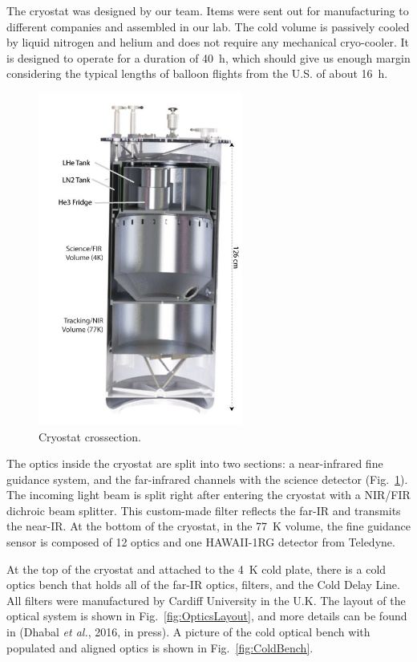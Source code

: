 The cryostat was designed by our team. Items were sent out for manufacturing to different companies and assembled in our lab. The cold volume is passively cooled by liquid nitrogen and helium and does not require any mechanical cryo-cooler. It is designed to operate for a duration of \SI{40}{\hour}, which should give us enough margin considering the typical lengths of balloon flights from the U.S. of about \SI{16}{\hour}. 

\begin{figure}[!h]
		\centering
		\includegraphics[width=0.6\textwidth]{Figures/Dewar.jpg} 
		\caption[Cryostat crossection]{Cryostat crossection.}
		\label{fig:CryostatCrosssection}
\end{figure}

The optics inside the cryostat are split into two sections: a near-infrared fine guidance system, and the far-infrared channels with the science detector (Fig.~\ref{fig:CryostatCrosssection}). The incoming light beam is split right after entering the cryostat with a NIR/FIR dichroic beam splitter. This custom-made filter reflects the far-IR and transmits the near-IR. At the bottom of the cryostat, in the \SI{77}{\kelvin} volume, the fine guidance sensor is composed of 12 optics and one HAWAII-1RG detector from Teledyne. 


At the top of the cryostat and attached to the \SI{4}{\kelvin} cold plate, there is a cold optics bench that holds all of the far-IR optics, filters, and the Cold Delay Line. All filters were manufactured by Cardiff University in the U.K. The layout of the optical system is shown in Fig.~\ref{fig:OpticsLayout}, and more details can be found in (Dhabal \textit{et al.}, 2016, in press). A picture of the cold optical bench with populated and aligned optics is shown in Fig.~\ref{fig:ColdBench}.

